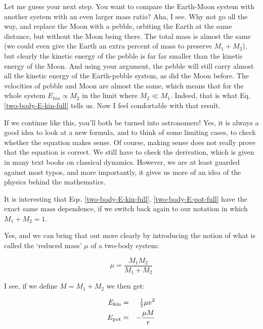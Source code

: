 \carol
Let me guess your next step.  You want to compare the Earth-Moon
system with another system with an even larger mass ratio?  Aha, I
see.  Why not go all the way, and replace the Moon with a pebble,
orbiting the Earth at the same distance, but without the Moon being
there.  The total mass is almost the same (we could even give the
Earth an extra percent of mass to preserve $M_1 + M_2$), but clearly
the kinetic energy of the pebble is far far smaller than the kinetic
energy of the Moon.  And using your argument, the pebble will still
carry almost all the kinetic energy of the Earth-pebble system, as did
the Moon before.  The velocities of pebble and Moon are almost the same,
which means that for the whole system $E_{kin} \propto M_2$ in the
limit where $M_2 \ll M_1$.  Indeed, that is what
Eq. \ref{two-body-E-kin-full} tells us.  Now I feel comfortable with
that result.

\alice
If we continue like this, you'll both be turned into astronomers!
Yes, it is always a good idea to look at a new formula, and to think
of some limiting cases, to check whether the equation makes sense.  Of
course, making sense does not really prove that the equation is correct.
We still have to check the derivation, which is given in many text books
on classical dynamics.  However, we are at least guarded against most
typos, and more importantly, it gives us more of an idea of the
physics behind the mathematics.

\bob
It is interesting that Eqs. \ref{two-body-E-kin-full},
\ref{two-body-E-pot-full} have the exact same mass dependence, if we
switch back again to our notation in which $M_1 + M_2 = 1$.

\alice
Yes, and we can bring that out more clearly by introducing the notion
of what is called the `reduced mass' $\mu$ of a two-body system:

\cba

\begin{equation}
\mu = \frac{M_1 M_2}{M_1 + M_2}
\end{equation}

\abc

\carol
I see, if we define $M = M_1 + M_2$ we then get:

\cba

\begin{eqnarray}
E_{\rm kin} & = & {\textstyle\frac{1}{2}} \mu v^2 \\
E_{\rm pot} & = & - \frac{\mu M}{r}
\end{eqnarray}

\abc

